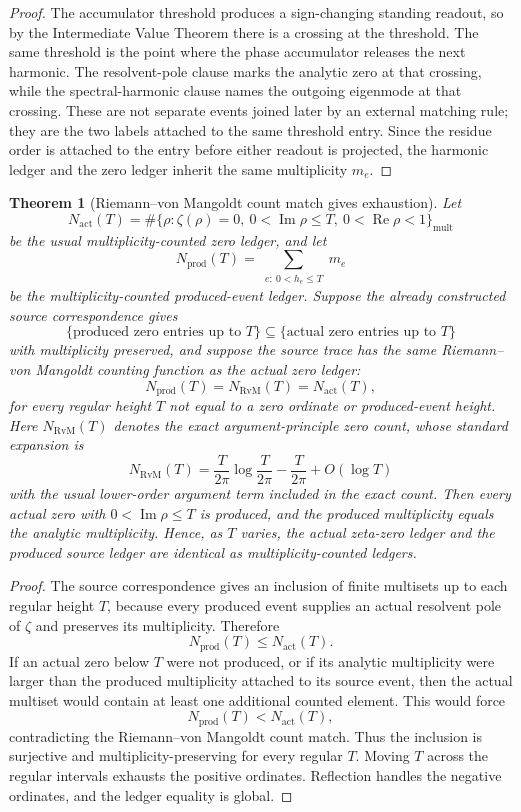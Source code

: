 \documentclass[11pt]{article}
\newtheorem{theorem}[definition]{Theorem}
\DeclareMathOperator{\Ree}{Re}
\DeclareMathOperator{\Imm}{Im}
\begin{document}
\begin{proof}
The accumulator threshold produces a sign-changing standing readout, so by the
Intermediate Value Theorem there is a crossing at the threshold.  The same
threshold is the point where the phase accumulator releases the next harmonic.
The resolvent-pole clause marks the analytic zero at that crossing, while the
spectral-harmonic clause names the outgoing eigenmode at that crossing.  These
are not separate events joined later by an external matching rule; they are the
two labels attached to the same threshold entry.  Since the residue order is
attached to the entry before either readout is projected, the harmonic ledger
and the zero ledger inherit the same multiplicity $m_e$.
\end{proof}

\begin{theorem}[Riemann--von Mangoldt count match gives exhaustion]
Let
\[
  N_{\mathrm{act}}(T)
  =
  \#\{\rho:\zeta(\rho)=0,\ 0<\Imm\rho\le T,\ 0<\Ree\rho<1\}_{\mathrm{mult}}
\]
be the usual multiplicity-counted zero ledger, and let
\[
  N_{\mathrm{prod}}(T)
  =
  \sum_{\substack{e:\ 0<h_e\le T}} m_e
\]
be the multiplicity-counted produced-event ledger.  Suppose the already
constructed source correspondence gives
\[
  \{\text{produced zero entries up to }T\}
  \subseteq
  \{\text{actual zero entries up to }T\}
\]
with multiplicity preserved, and suppose the source trace has the same
Riemann--von Mangoldt counting function as the actual zero ledger:
\[
  N_{\mathrm{prod}}(T)
  =
  N_{\mathrm{RvM}}(T)
  =
  N_{\mathrm{act}}(T),
\]
for every regular height $T$ not equal to a zero ordinate or produced-event
height.  Here $N_{\mathrm{RvM}}(T)$ denotes the exact argument-principle zero
count, whose standard expansion is
\[
  N_{\mathrm{RvM}}(T)
  =
  \frac{T}{2\pi}\log\frac{T}{2\pi}
  -\frac{T}{2\pi}
  +O(\log T)
\]
with the usual lower-order argument term included in the exact count.  Then
every actual zero with $0<\Imm\rho\le T$ is produced, and the produced
multiplicity equals the analytic multiplicity.  Hence, as $T$ varies, the
actual zeta-zero ledger and the produced source ledger are identical as
multiplicity-counted ledgers.
\end{theorem}

\begin{proof}
The source correspondence gives an inclusion of finite multisets up to each
regular height $T$, because every produced event supplies an actual resolvent
pole of $\zeta$ and preserves its multiplicity.  Therefore
\[
  N_{\mathrm{prod}}(T)\le N_{\mathrm{act}}(T).
\]
If an actual zero below $T$ were not produced, or if its analytic multiplicity
were larger than the produced multiplicity attached to its source event, then
the actual multiset would contain at least one additional counted element.
This would force
\[
  N_{\mathrm{prod}}(T)<N_{\mathrm{act}}(T),
\]
contradicting the Riemann--von Mangoldt count match.  Thus the inclusion is
surjective and multiplicity-preserving for every regular $T$.  Moving $T$
across the regular intervals exhausts the positive ordinates.  Reflection
handles the negative ordinates, and the ledger equality is global.
\end{proof}
\end{document}
